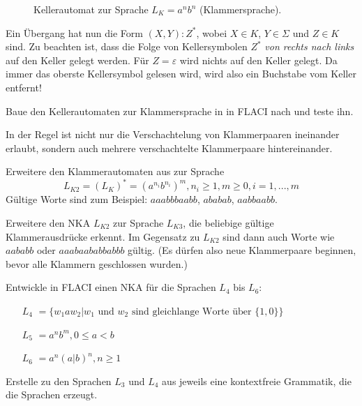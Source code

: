 \documentclass[10pt, a4paper]{scrartcl}
\begin{document}
\begin{figure}[h]
	\centering
    \begin{transitiongraph}[pa]
	    \end{transitiongraph}
	\caption{Kellerautomat zur Sprache $L_K= a^nb^n$ (Klammersprache).}
	\label{abb:nka_klammern}
\end{figure}

Ein Übergang hat nun die Form $(X, Y): Z^{*}$, wobei $X\in K$, $Y\in \Sigma$ und $Z\in K$ sind. Zu beachten ist, dass die Folge von Kellersymbolen $Z^{*}$ \emph{von rechts nach links} auf den Keller gelegt werden. Für $Z = \varepsilon$ wird nichts auf den Keller gelegt. Da immer das oberste Kellersymbol gelesen wird, wird also ein Buchstabe vom Keller entfernt!

\newpage

\begin{aufgabe}
\label{aufg:nka-klammern}
Baue den Kellerautomaten zur Klammersprache in  in FLACI nach und teste ihn.
\end{aufgabe}

\begin{aufgabe}
\label{aufg:nka-klammern2}
In der Regel ist nicht nur die Verschachtelung von Klammerpaaren ineinander erlaubt, sondern auch mehrere verschachtelte Klammerpaare hintereinander.

\begin{teilaufgaben}
	\teilaufgabe
	Erweitere den Klammerautomaten aus  zur Sprache
	\[ L_{K2} = (L_K)^{*} = (a^{n_i}b^{n_i})^{m}, n_i\geq 1, m\geq 0, i = 1,...,m \]
	Gültige Worte sind zum Beispiel: $aaabbbaabb$, $ababab$, $aabbaabb$.

	\teilaufgabe
	Erweitere den NKA $L_{K2}$ zur Sprache $L_{K3}$, die beliebige gültige Klammerausdrücke erkennt. Im Gegensatz zu $L_{K2}$ sind dann auch Worte wie $aababb$ oder $aaabaababbabbb$ gültig. (Es dürfen also neue Klammerpaare beginnen, bevor alle Klammern geschlossen wurden.)
\end{teilaufgaben}
\end{aufgabe}

\begin{aufgabe}
\label{aufg:nka-gleichlang}
Entwickle in FLACI einen NKA für die Sprachen $L_4$ bis $L_6$:

\begin{itemize}
	\item[$L_4$]$ = \{ w_1 a w_2 | w_1\text{ und }w_2\text{ sind gleichlange Worte über }\{1,0\} \}$
	\item[$L_5$]$ = a^nb^m, 0 \leq a < b$
	\item[$L_6$]$ = a^n(a|b)^n, n \geq 1$
\end{itemize}
\end{aufgabe}

\begin{aufgabe}
\label{aufg:grammatiken-gleichlang}

Erstelle zu den Sprachen $L_3$ und $L_4$ aus  jeweils eine kontextfreie Grammatik, die die Sprachen erzeugt.
\end{aufgabe}
\end{document}
